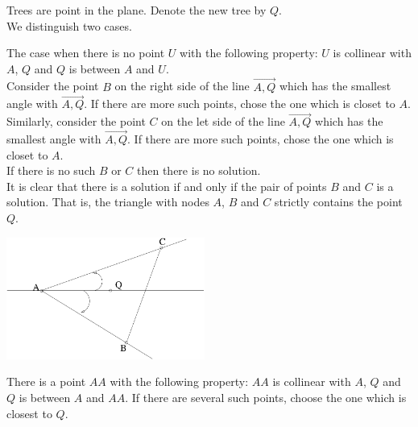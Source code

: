 
Trees are point in the plane. Denote the new tree by $Q$.\\
We distinguish two cases.

The case when there is no point $U$ with the following property: $U$ is collinear with $A$, $Q$ and $Q$ is between $A$ and $U$.\\
Consider the point $B$ on the right side of the line $\overrightarrow{A,Q}$ which has the smallest angle with $\overrightarrow{A,Q}$. If there are more such points, chose the one which is closet to $A$.\\
Similarly, consider the point $C$ on the let side of the line $\overrightarrow{A,Q}$ which has the smallest angle with $\overrightarrow{A,Q}$. If there are more such points, chose the one which is closet to $A$.\\
If there is no such $B$ or $C$ then there is no solution.\\
It is clear that there is a solution if and only if the pair of points $B$ and $C$ is a solution. That is, the triangle with nodes $A$, $B$ and $C$ strictly contains the point $Q$.

\begin{center}
\includegraphics[height=4cm]{img/abra41.pdf}
\end{center}

There is a point $AA$ with the following property: $AA$ is collinear with $A$, $Q$ and $Q$ is between $A$ and $AA$. If there are several such points, choose the one which is closest to $Q$.\\


